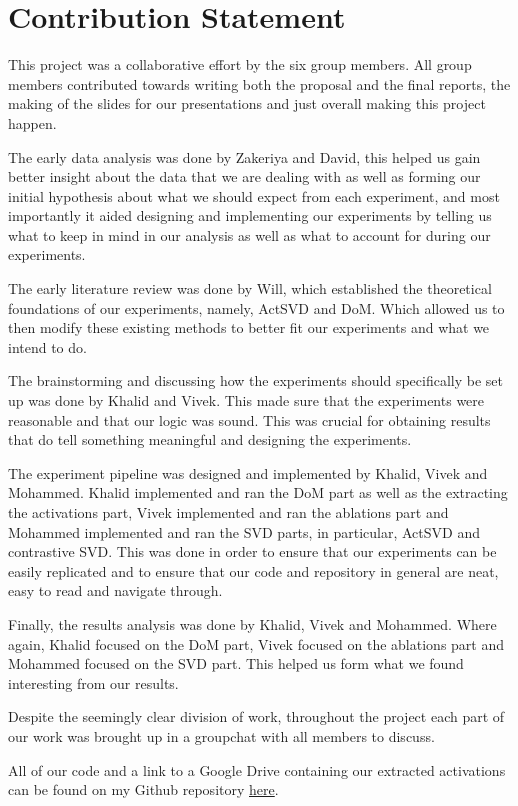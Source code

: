 \section{Contribution Statement}
This project was a collaborative effort by the six group members. All group members 
contributed towards writing both the proposal and the final reports, the making of the
slides for our presentations and just overall making this project happen. 

The early data analysis was done by Zakeriya and David, this helped us gain better insight about the data
that we are dealing with as well as forming our initial hypothesis about what we should expect from each
experiment, and most importantly it aided designing and implementing our experiments by telling us what
to keep in mind in our analysis as well as what to account for during our experiments.

The early literature review was done by Will, which established the theoretical foundations of our 
experiments, namely, ActSVD and DoM. Which allowed us to then modify these existing methods to better 
fit our experiments and what we intend to do.

The brainstorming and discussing how the experiments should specifically be set up was done
by Khalid and Vivek. This made sure that the experiments were reasonable and that our logic was sound.
This was crucial for obtaining results that do tell something meaningful and designing the experiments.

The experiment pipeline was designed and implemented by Khalid, Vivek and Mohammed. Khalid implemented
and ran the DoM part as well as the extracting the activations part, 
Vivek implemented and ran the ablations part and Mohammed implemented and ran the SVD parts, in particular,
ActSVD and contrastive SVD. This was done in order to ensure that our experiments can be easily replicated and to ensure that our code and 
repository in general are neat, easy to read and navigate through.

Finally, the results analysis was done by Khalid, Vivek and Mohammed. Where again, Khalid focused on the 
DoM part, Vivek focused on the ablations part and Mohammed focused on the SVD part. This helped us form what
we found interesting from our results. 

Despite the seemingly clear division of work, throughout the project each part of our work was brought up
in a groupchat with all members to discuss.

All of our code and a link to a Google Drive containing our extracted activations 
can be found on my Github repository \href{https://github.com/khalidraisi/safety-utility-disentanglement.git}{here}.